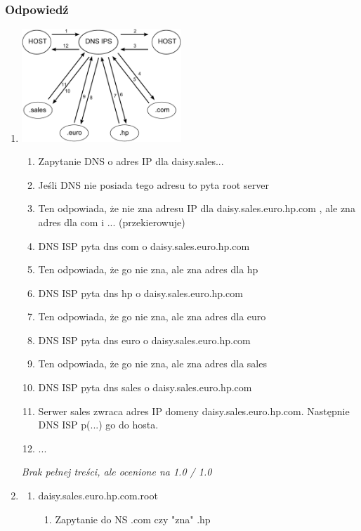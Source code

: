 		\subsubsection{Odpowiedź}
			\begin{enumerate}[A]
				\item \includegraphics[width=6cm]{./images/zadanie01.pdf}\\
				\begin{enumerate}[1]
					\item Zapytanie DNS o adres IP dla daisy.sales...
					\item Jeśli DNS nie posiada tego adresu to pyta root server
					\item Ten odpowiada, że nie zna adresu IP dla daisy.sales.euro.hp.com , ale zna adres dla com i ... (przekierowuje)
					\item DNS ISP pyta dns com o daisy.sales.euro.hp.com
					\item Ten odpowiada, że go nie zna, ale zna adres dla hp
					\item DNS ISP pyta dns hp o daisy.sales.euro.hp.com
					\item Ten odpowiada, że go nie zna, ale zna adres dla euro
					\item DNS ISP pyta dns euro o daisy.sales.euro.hp.com
					\item Ten odpowiada, że go nie zna, ale zna adres dla sales
					\item DNS ISP pyta dns sales o daisy.sales.euro.hp.com
					\item Serwer sales zwraca adres IP domeny daisy.sales.euro.hp.com. Następnie DNS ISP p(...) go do hosta.
					\item ...
				\end{enumerate}
				\small{ \emph{Brak pełnej treści, ale ocenione na 1.0 / 1.0}}
				\item
					\begin{enumerate}
						\item daisy.sales.euro.hp.com.root
						\begin{enumerate}[1]
							\item Zapytanie do NS .com czy "zna" .hp

\end{enumerate}
\end{enumerate}
\end{enumerate}
